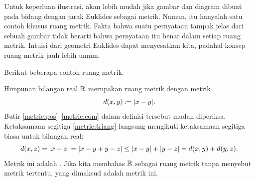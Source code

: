 Untuk keperluan ilustrasi, akan lebih mudah jika gambar dan diagram dibuat
pada bidang dengan jarak Euklides sebagai metrik.  Namun, itu hanyalah
satu contoh khusus ruang metrik.  Fakta bahwa suatu pernyataan tampak
jelas dari sebuah gambar tidak berarti bahwa pernyataan itu benar dalam
setiap ruang metrik.  Intuisi dari geometri Euklides dapat menyesatkan
kita, padahal konsep ruang metrik jauh lebih umum.

Berikut beberapa contoh ruang metrik.

\begin{example}
Himpunan bilangan real ${\mathbb{R}}$ merupakan ruang metrik dengan metrik
\begin{equation*}
d(x,y) \coloneqq \lvert {x-y} \rvert .
\end{equation*}
Butir \ref{metric:pos}--\ref{metric:com} dalam definisi tersebut
mudah diperiksa.  Ketaksamaan segitiga \ref{metric:triang} langsung
mengikuti ketaksamaan segitiga biasa untuk bilangan real:
\begin{equation*}
d(x,z) = \lvert {x-z} \rvert = 
\lvert {x-y+y-z} \rvert \leq
\lvert {x-y} \rvert+\lvert {y-z} \rvert =
d(x,y)+ d(y,z) .
\end{equation*}
Metrik ini adalah \emph{}.  Jika kita
membahas ${\mathbb{R}}$ sebagai ruang metrik tanpa menyebut metrik tertentu,
yang dimaksud adalah metrik ini.
\end{example}

